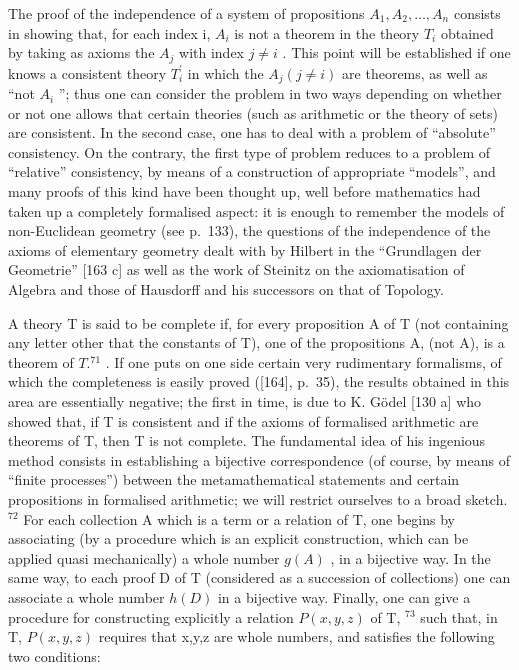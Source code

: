 The proof of the independence of a system of propositions \(A_{1}, A_{2}, \ldots, A_{n}\) consists in showing that, for each index i, \(A_{i}\) is not a theorem in the theory \(T_{i}\) obtained by taking as axioms the \(A_{j}\) with index \(j \neq i\) . This point will be established if one knows a consistent theory \(T_{i}^{\prime}\) in which the \(A_{j}(j \neq i)\) are theorems, as well as ``not \(A_{i}\) ''; thus one can consider the problem in two ways depending on whether or not one allows that certain theories (such as arithmetic or the theory of sets) are consistent. In the second case, one has to deal with a problem of ``absolute'' consistency. On the contrary, the first type of problem reduces to a problem of ``relative'' consistency, by means of a construction of appropriate ``models'', and many proofs of this kind have been thought up, well before mathematics had taken up a completely formalised aspect: it is enough to remember the models of non-Euclidean geometry (see p.~133), the questions of the independence of the axioms of elementary geometry dealt with by Hilbert in the ``Grundlagen der Geometrie'' {[}163 c{]} as well as the work of Steinitz on the axiomatisation of Algebra and those of Hausdorff and his successors on that of Topology.

A theory T is said to be complete if, for every proposition A of T (not containing any letter other that the constants of T), one of the propositions A, (not A), is a theorem of \(T.^{71}\) . If one puts on one side certain very rudimentary formalisms, of which the completeness is easily proved ({[}164{]}, p.~35), the results obtained in this area are essentially negative; the first in time, is due to K. Gödel {[}130 a{]} who showed that, if T is consistent and if the axioms of formalised arithmetic are theorems of T, then T is not complete. The fundamental idea of his ingenious method consists in establishing a bijective correspondence (of course, by means of ``finite processes'') between the metamathematical statements and certain propositions in formalised arithmetic; we will restrict ourselves to a broad sketch. \(^{72}\) For each collection A which is a term or a relation of T, one begins by associating (by a procedure which is an explicit construction, which can be applied quasi mechanically) a whole number \(g(A)\) , in a bijective way. In the same way, to each proof D of T (considered as a succession of collections) one can associate a whole number \(h(D)\) in a bijective way. Finally, one can give a procedure for constructing explicitly a relation \(P(x,y,z)\) of T, \(^{73}\) such that, in T, \(P(x,y,z)\) requires that x,y,z are whole numbers, and satisfies the following two conditions:

